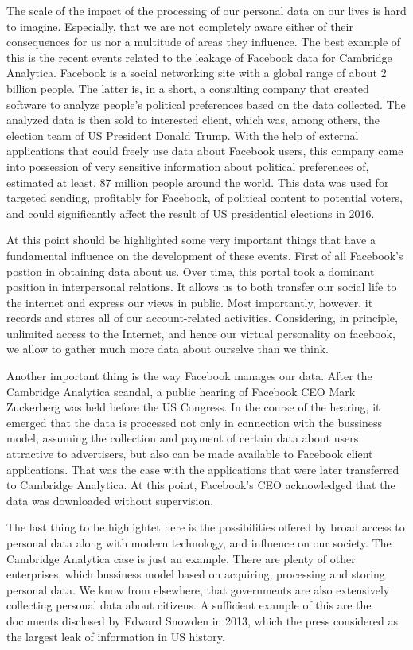 \documentclass[en, noamssymb]{mgr}
\begin{document}
The scale of the impact of the processing of our personal data on our lives is hard to imagine. Especially, that we are not completely aware either of their consequences for us nor a multitude of areas they influence. The best example of this is the recent events related to the leakage of Facebook data for Cambridge Analytica. Facebook is a social networking site with a global range of about 2 billion people. The latter is, in a short, a consulting company that created software to analyze people's political preferences based on the data collected. The analyzed data is then sold to interested client, which was, among others, the election team of US President Donald Trump. With the help of external applications that could freely use data about Facebook users, this company came into possession of very sensitive information about political preferences of, estimated at least, 87 million people around the world. This data was used for targeted sending, profitably for Facebook, of political content to potential voters, and could significantly affect the result of US presidential elections in 2016.

\indent At this point should be highlighted some very important things that have a fundamental influence on the development of these events. First of all Facebook's postion in obtaining data about us. Over time, this portal took a dominant position in interpersonal relations. It allows us to both transfer our social life to the internet and express our views in public. Most importantly, however, it records and stores all of our account-related activities. Considering, in principle, unlimited access to the Internet, and hence our virtual personality on facebook, we allow to gather much more data about ourselve than we think. 

\indent Another important thing is the way Facebook manages our data. After the Cambridge Analytica scandal, a public hearing of Facebook CEO Mark Zuckerberg was held before the US Congress. In the course of the hearing, it emerged that the data is processed not only in connection with the bussiness model, assuming the collection and payment of certain data about users attractive to advertisers, but also can be made available to Facebook client applications. That was the case with the applications that were later transferred to Cambridge Analytica. At this point, Facebook's CEO acknowledged that the data was downloaded without supervision.     

\indent The last thing to be highlightet here is the possibilities offered by broad access to personal data along with modern technology, and influence on our society.
The Cambridge Analytica case is just an example. There are plenty of other enterprises, which bussiness model based on acquiring, processing and storing personal data. We know from elsewhere, that governments are also extensively collecting personal data about citizens. A sufficient example of this are the documents disclosed by Edward Snowden in 2013, which the press considered as the largest leak of information in US history.
\end{document}
